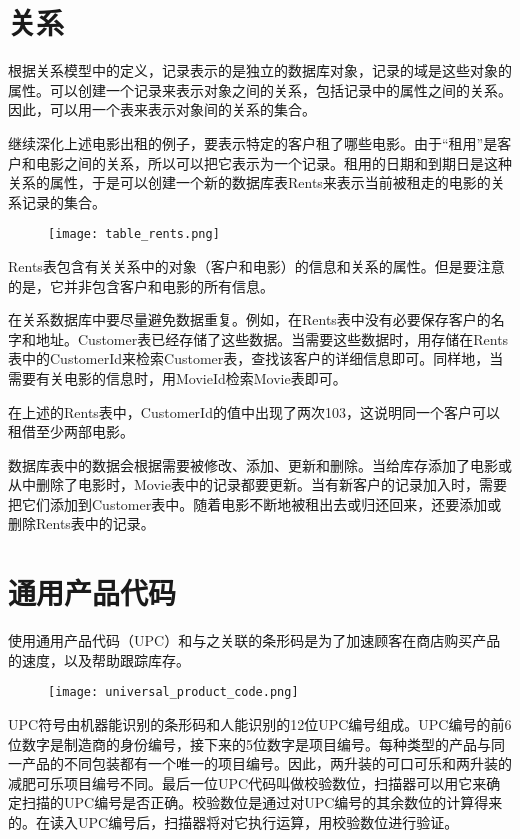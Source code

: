 \section{关系}


根据关系模型中的定义，记录表示的是独立的数据库对象，记录的域是这些对象的属性。可以创建一个记录来表示对象之间的关系，包括记录中的属性之间的关系。因此，可以用一个表来表示对象间的关系的集合。


继续深化上述电影出租的例子，要表示特定的客户租了哪些电影。由于“租用”是客户和电影之间的关系，所以可以把它表示为一个记录。租用的日期和到期日是这种关系的属性，于是可以创建一个新的数据库表Rents来表示当前被租走的电影的关系记录的集合。



\begin{figure}[!h]
\centering
\texttt{[image: table\_rents.png]}
\label{table_rents}
\end{figure}


Rents表包含有关关系中的对象（客户和电影）的信息和关系的属性。但是要注意的是，它并非包含客户和电影的所有信息。

在关系数据库中要尽量避免数据重复。例如，在Rents表中没有必要保存客户的名字和地址。Customer表已经存储了这些数据。当需要这些数据时，用存储在Rents表中的CustomerId来检索Customer表，查找该客户的详细信息即可。同样地，当需要有关电影的信息时，用MovieId检索Movie表即可。


在上述的Rents表中，CustomerId的值中出现了两次103，这说明同一个客户可以租借至少两部电影。


数据库表中的数据会根据需要被修改、添加、更新和删除。当给库存添加了电影或从中删除了电影时，Movie表中的记录都要更新。当有新客户的记录加入时，需要把它们添加到Customer表中。随着电影不断地被租出去或归还回来，还要添加或删除Rents表中的记录。


	
\section{通用产品代码}

使用通用产品代码（UPC）和与之关联的条形码是为了加速顾客在商店购买产品的速度，以及帮助跟踪库存。

\begin{figure}[!h]
\centering
\texttt{[image: universal\_product\_code.png]}
\label{universal_product_code}
\end{figure}


UPC符号由机器能识别的条形码和人能识别的12位UPC编号组成。UPC编号的前6位数字是制造商的身份编号，接下来的5位数字是项目编号。每种类型的产品与同一产品的不同包装都有一个唯一的项目编号。因此，两升装的可口可乐和两升装的减肥可乐项目编号不同。最后一位UPC代码叫做校验数位，扫描器可以用它来确定扫描的UPC编号是否正确。校验数位是通过对UPC编号的其余数位的计算得来的。在读入UPC编号后，扫描器将对它执行运算，用校验数位进行验证。

